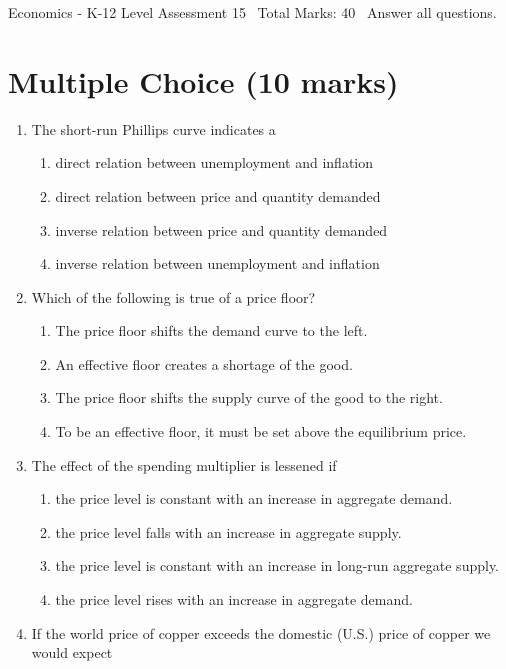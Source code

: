 \documentclass[12pt]{article}
\begin{document}
\begin{center}
Economics - K-12 Level Assessment 15 \
Total Marks: 40 \
Answer all questions.
\end{center}

\section*{Multiple Choice (10 marks)}
\begin{enumerate}[label=\arabic*.]
\item The short-run Phillips curve indicates a
\begin{enumerate}[label=(\alph*)]
    \item direct relation between unemployment and inflation
    \item direct relation between price and quantity demanded
    \item inverse relation between price and quantity demanded
    \item inverse relation between unemployment and inflation
\end{enumerate}
\item Which of the following is true of a price floor?
\begin{enumerate}[label=(\alph*)]
    \item The price floor shifts the demand curve to the left.
    \item An effective floor creates a shortage of the good.
    \item The price floor shifts the supply curve of the good to the right.
    \item To be an effective floor, it must be set above the equilibrium price.
\end{enumerate}
\item The effect of the spending multiplier is lessened if
\begin{enumerate}[label=(\alph*)]
    \item the price level is constant with an increase in aggregate demand.
    \item the price level falls with an increase in aggregate supply.
    \item the price level is constant with an increase in long-run aggregate supply.
    \item the price level rises with an increase in aggregate demand.
\end{enumerate}
\item If the world price of copper exceeds the domestic (U.S.) price of copper we would expect

\end{enumerate}
\end{document}
